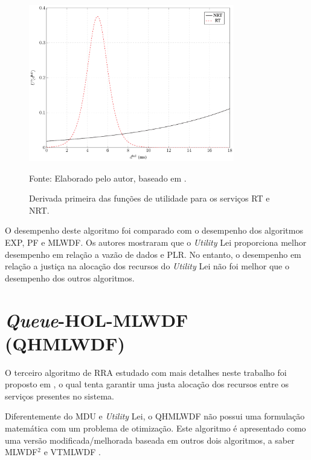 \begin{figure}[ht]
	\centering	
	
	\caption[Derivada primeira das funções de utilidade para os serviços RT e NRT]{Derivada primeira das funções de utilidade para os serviços RT e NRT.}
	\includegraphics[width=0.8\textwidth]{figs/MarginalWeightLEIOriginal.pdf}
	
	{Fonte: Elaborado pelo autor, baseado em \cite{Proc:Lei2007}.}
	\label{fig:WeightLEI}
\end{figure} 

O desempenho deste algoritmo foi comparado com o desempenho dos algoritmos EXP, PF e MLWDF. Os autores mostraram que o \textit{Utility} Lei proporciona melhor desempenho em relação a vazão de dados e PLR. No entanto, o desempenho em relação a justiça na alocação dos recursos do \textit{Utility} Lei não foi melhor que o desempenho dos outros algoritmos.   

\section{\textit{Queue}-HOL-MLWDF (QHMLWDF)}

O terceiro algoritmo de RRA estudado com mais detalhes neste trabalho foi proposto em , o qual tenta garantir uma justa alocação dos recursos entre os serviços presentes no sistema.

Diferentemente do MDU e \textit{Utility} Lei, o QHMLWDF não possui uma formulação matemática com um problema de otimização. Este algoritmo é apresentado como uma versão modificada/melhorada baseada em outros dois algoritmos, a saber MLWDF$^{2}$ \cite{ameigeiras2004performance} e \ac{VTMLWDF} \cite{iturralde2011performance}.

